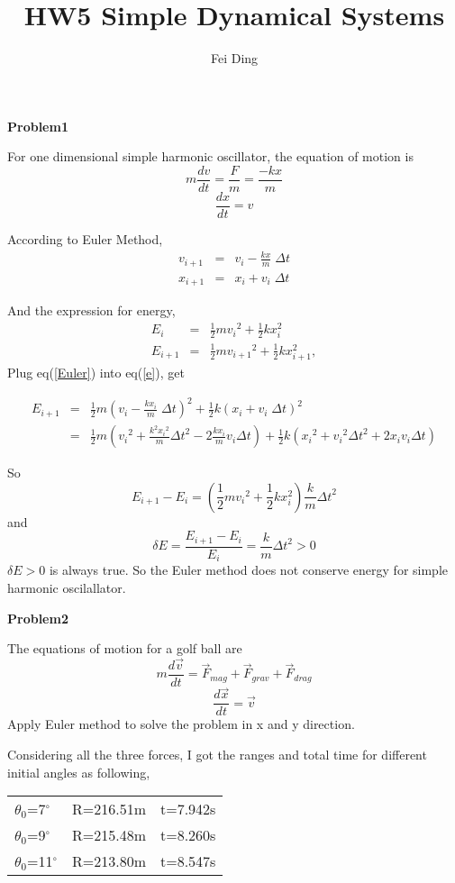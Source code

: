 \documentclass{article}
\title{HW5 Simple Dynamical Systems}
\author{Fei Ding}
\begin{document}
\maketitle

\textbf{Problem1}

For one dimensional simple harmonic oscillator, the equation of motion is
\[m\frac{dv}{dt}=\frac{F}{m}=\frac{-kx}{m}\] 
\[\frac{dx}{dt}=v\]
 
According to Euler Method,
\begin{eqnarray}\label{Euler}
v_{i+1} &=& v_ i - \frac{kx}{m} \; \Delta t \\
x_{i+1} &=& x_i + v_i \; \Delta t \nonumber
\end{eqnarray}

And the expression for energy, 
\begin{eqnarray}\label{e}
E_i& =& \frac{1}{2}m {v_i}^2 + \frac{1}{2}k x_{i}^2\nonumber\\
E_{i+1} &=& \frac{1}{2}m {v_{i+1}}^2 + \frac{1}{2}k x_{i+1}^2,
\end{eqnarray}
Plug eq(\ref{Euler}) into eq(\ref{e}), get

\begin{eqnarray*}
E_{i+1}&=& \frac{1}{2}m (v_i - \frac{kx_i}{m} \; \Delta t)^2 + \frac{1}{2}k (x_i + v_i \; \Delta t)^2 \\
&=& \frac{1}{2}m ({v_i}^2 + \frac{k^2 {x_i}^2}{m} {\Delta t}^2 -2 \frac{kx_i}{m}v_i \Delta t ) + \frac{1}{2} k ( {x_i}^2 + {v_i}^2 {\Delta t}^2 + 2 x_i v_i \Delta t )
\end{eqnarray*}

So 
\[E_{i+1}-E_{i} = (\frac{1}{2}m {v_i}^2 + \frac{1}{2}k x_{i}^2 )\frac{k}{m} {\Delta t}^2\]
and
\[\delta E = \frac{E_{i+1}-E_i}{E_i} = \frac{k}{m} {\Delta t}^2>0\]
$\delta E>0$ is always true.  So the Euler method does not conserve energy for simple harmonic oscilallator.




\vskip 1cm



\textbf{Problem2}

The equations of motion for a golf ball are 
\[m\frac{d\vec{v}}{dt}=\vec{F}_{mag}+\vec{F}_{grav}+\vec{F}_{drag}\] 
\[\frac{d\vec{x}}{dt}=\vec{v}\]
Apply Euler method to solve the problem in x and y direction.

Considering all the three forces, I got the ranges and total time for different initial angles as following,

\begin{tabular}{lll}
$\theta_0$=7$^\circ$  &  R=216.51m   & t=7.942s\\
$\theta_0$=9$^\circ$     &R=215.48m    &t=8.260s\\
$\theta_0$=11$^\circ$   &R=213.80m    &t=8.547s
\end{tabular}
\end{document}
